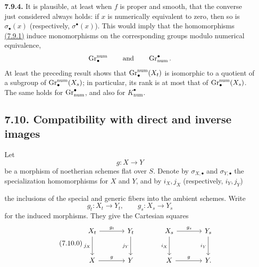 \textbf{7.9.4.}
It is plausible, at least when $f$ is proper and smooth, that the converse
just considered always holds: if $x$ is numerically equivalent to zero,
then so is $\sigma_\bullet(x)$ (respectively, $\sigma^\bullet(x)$). This
would imply that the homomorphisms \hyperlink{sga6.e10.eq.7-9-1}{(7.9.1)} induce monomorphisms on the
corresponding groups modulo numerical equivalence,
\[
\operatorname{Gr}_\bullet^{\mathrm{num}}
\qquad\text{and}\qquad
\operatorname{Gr}_{\mathrm{num}}^\bullet.
\]
At least the preceding result shows that
$\operatorname{Gr}_\bullet^{\mathrm{num}}(X_t)$ is isomorphic to a quotient of a subgroup
of $\operatorname{Gr}_\bullet^{\mathrm{num}}(X_s)$; in particular, its rank is at most
that of $\operatorname{Gr}_\bullet^{\mathrm{num}}(X_s)$. The same holds for
$\operatorname{Gr}_{\mathrm{num}}^\bullet$, and also for $K_{\mathrm{num}}^\bullet$.

\subsection*{7.10. Compatibility with direct and inverse images}
Let
\[
g:X\longrightarrow Y
\]
be a morphism of noetherian schemes flat over $S$. Denote by
$\sigma_{X,\bullet}$ and $\sigma_{Y,\bullet}$ the specialization
homomorphisms for $X$ and $Y$, and by
$i_X,j_X$ (respectively, $i_Y,j_Y$)

the inclusions of the special and generic fibers into the ambient schemes.
Write
\[
g_t:X_t\longrightarrow Y_t,
\qquad
g_s:X_s\longrightarrow Y_s
\]
for the induced morphisms. They give the Cartesian squares
\begin{equation}\tag{7.10.0}
\begin{tikzcd}[column sep=large,row sep=large]
X_t \arrow[r,"g_t"] \arrow[d,"j_X"'] & Y_t \arrow[d,"j_Y"'] &
X_s \arrow[r,"g_s"] \arrow[d,"i_X"'] & Y_s \arrow[d,"i_Y"']\\
X \arrow[r,"g"] & Y & X \arrow[r,"g"] & Y.
\end{tikzcd}
\end{equation}

